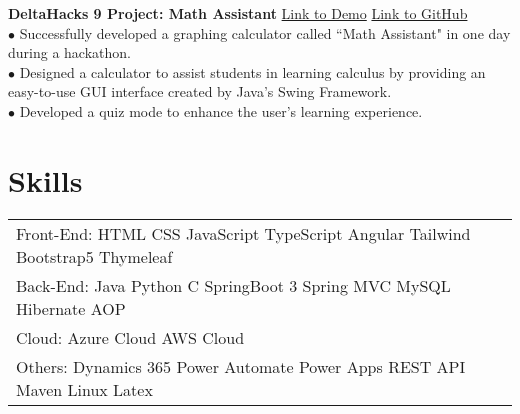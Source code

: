 \documentclass[letterpaper,12pt]{article}
\begin{document}
\textbf{DeltaHacks 9 Project: Math Assistant} \hfill \href{https://devpost.com/software/math-helper-graphing-calculator}{Link to Demo} \hspace{0.2cm} \href{https://github.com/Zicheng-Li/Math_helper}{Link to GitHub} \\
\hspace{0.1cm} $\bullet$ \hspace{1em}Successfully developed a graphing calculator called ``Math Assistant" in one day during a hackathon. \\
\hspace{0.1cm} $\bullet$ \hspace{1em}Designed a calculator to assist students in learning calculus by providing an easy-to-use GUI interface created by Java's Swing Framework.\\ 
\hspace{0.1cm} $\bullet$ \hspace{0.4cm}Developed a quiz mode to enhance the user's learning experience.

\section{Skills}
\begin{tabularx}{\linewidth}{@{}l X@{}}
Front-End: \hspace{0.05cm} HTML \hspace{0.05cm} CSS \hspace{0.55cm} JavaScript \hspace{0.2cm} TypeScript \hspace{0.2cm} Angular \hspace{0.2cm} Tailwind \hspace{0.2cm} Bootstrap5 \hspace{0.2cm} Thymeleaf \\
Back-End: \hspace{0.05cm} Java \hspace{0.37cm} Python \hspace{0.1cm} C \hspace{0.1cm} SpringBoot 3 \hspace{0.05cm} Spring MVC  \hspace{0.1cm} MySQL \hspace{0.1cm} Hibernate \hspace{0.1cm} AOP \\
Cloud:  \hspace{0.75cm} Azure Cloud \hspace{0.55cm} AWS Cloud  \\
Others: \hspace{0.57cm} Dynamics 365 \hspace{0.2cm} Power Automate \hspace{0.1cm} Power Apps \hspace{0.1cm} REST API \hspace{0.1cm} Maven \hspace{0.1cm} Linux \hspace{0.1cm} Latex \\
\end{tabularx}
\end{document}
